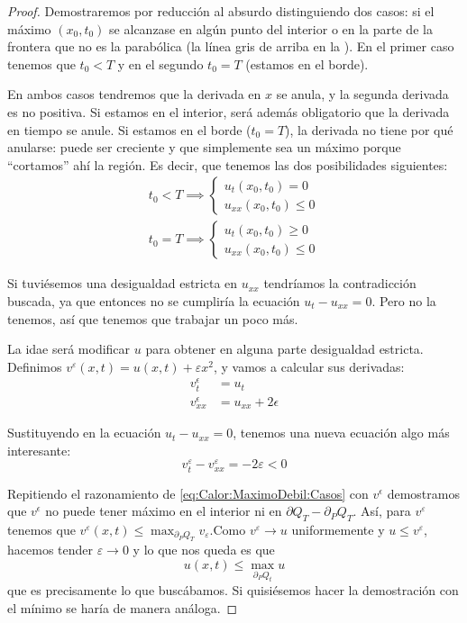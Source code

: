	 \begin{proof}
	 	Demostraremos por reducción al absurdo distinguiendo dos casos: si el máximo $(x_0, t_0)$ se alcanzase en algún punto del interior o en la parte de la frontera que no es la parabólica (la línea gris de arriba en la ). En el primer caso tenemos que $t_0 < T$ y en el segundo $t_0 = T$ (estamos en el borde).

	 	En ambos casos tendremos que la derivada en $x$ se anula, y la segunda derivada es no positiva. Si estamos en el interior, será además obligatorio que la derivada en tiempo se anule. Si estamos en el borde ($t_0 = T$), la derivada no tiene por qué anularse: puede ser creciente y que simplemente sea un máximo porque ``cortamos'' ahí la región.  Es decir, que tenemos las dos posibilidades siguientes:
	 	\begin{gather}
	 	t_0 < T \implies \begin{cases} u_t(x_0, t_0) = 0 \\ u_{xx} (x_0, t_0) ≤ 0 \end{cases}
	 	\nonumber \\
	 	t_0 = T \implies \begin{cases} u_t(x_0, t_0) ≥ 0 \\ u_{xx} (x_0, t_0) ≤ 0 \end{cases}
	 	\label{eq:Calor:MaximoDebil:Casos}
	 	\end{gather}

	 	Si tuviésemos una desigualdad estricta en $u_{xx}$ tendríamos la contradicción buscada, ya que entonces no se cumpliría la ecuación $u_{t} - u_{xx} = 0$. Pero no la tenemos, así que tenemos que trabajar un poco más.

	 	La idae será modificar $u$ para obtener en alguna parte desigualdad estricta. Definimos $v^ε(x,t) = u(x,t) + εx^2$, y vamos a calcular sus derivadas:
	 	\begin{align*}
	 		v^\epsilon_t &= u_t \\
			v^\epsilon_{xx} &= u_{xx} + 2\epsilon
		\end{align*}

		Sustituyendo en la ecuación $u_{t} - u_{xx} = 0$, tenemos una nueva ecuación algo más interesante: \[ v^ε_t - v^ε_{xx} = -2ε < 0 \]

		Repitiendo el razonamiento de \eqref{eq:Calor:MaximoDebil:Casos} con $v^\epsilon$ demostramos que $v^\epsilon$ no puede tener máximo en el interior ni en $\partial Q_T - \partial_P Q_T$. Así, para $v^ε$ tenemos que $v^ε(x,t) ≤ \max_{∂_PQ_T} v_ε$.Como $v^ε \to u$ uniformemente y $u ≤ v^ε$, hacemos tender $ε \to 0$ y lo que nos queda es que \[ u(x,t) ≤ \max_{∂_PQ_t} u \] que es precisamente lo que buscábamos. Si quisiésemos hacer la demostración con el mínimo se haría de manera análoga.
	 \end{proof}

